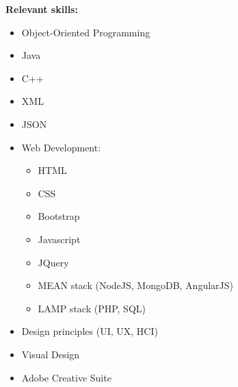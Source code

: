 \documentclass[12pt,a4paper]{article}
\begin{document}
		\parbox{\textwidth}{		
			\textbf{\small Relevant skills:}
			\begin{itemize}\itemsep0em
				\item Object-Oriented Programming
				\item Java
				\item C++
				\item XML
				\item JSON
				\item Web Development:
				\begin {itemize}\itemsep0em
					\item HTML
					\item CSS
					\item Bootstrap
					\item Javascript
					\item JQuery
					\item MEAN stack (NodeJS, MongoDB, AngularJS)
					\item LAMP stack (PHP, SQL)
				\end {itemize}
				\item Design principles (UI, UX, HCI)
				\item Visual Design
				\item Adobe Creative Suite

			\end{itemize}
		}
		
\end{document}
